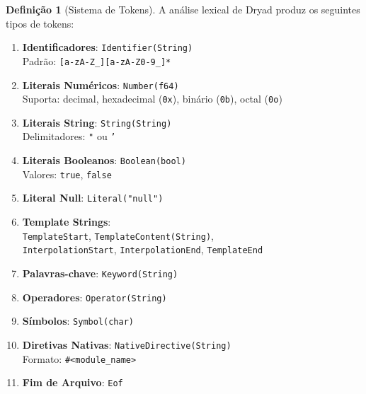 \documentclass[12pt,a4paper]{article}
\theoremstyle{definition}
\newtheorem{definition}{Definição}[section]
\begin{document}
\begin{definition}[Sistema de Tokens]
A análise lexical de Dryad produz os seguintes tipos de tokens:

\begin{enumerate}
    \item \textbf{Identificadores}: \texttt{Identifier(String)} \\
    Padrão: \texttt{[a-zA-Z\_][a-zA-Z0-9\_]*}
    
    \item \textbf{Literais Numéricos}: \texttt{Number(f64)} \\
    Suporta: decimal, hexadecimal (\texttt{0x}), binário (\texttt{0b}), octal (\texttt{0o})
    
    \item \textbf{Literais String}: \texttt{String(String)} \\
    Delimitadores: \texttt{"} ou \texttt{'}
    
    \item \textbf{Literais Booleanos}: \texttt{Boolean(bool)} \\
    Valores: \texttt{true}, \texttt{false}
    
    \item \textbf{Literal Null}: \texttt{Literal("null")}
    
    \item \textbf{Template Strings}: \\
    \texttt{TemplateStart}, \texttt{TemplateContent(String)}, \\
    \texttt{InterpolationStart}, \texttt{InterpolationEnd}, \texttt{TemplateEnd}
    
    \item \textbf{Palavras-chave}: \texttt{Keyword(String)}
    
    \item \textbf{Operadores}: \texttt{Operator(String)}
    
    \item \textbf{Símbolos}: \texttt{Symbol(char)}
    
    \item \textbf{Diretivas Nativas}: \texttt{NativeDirective(String)} \\
    Formato: \texttt{\#<module\_name>}
    
    \item \textbf{Fim de Arquivo}: \texttt{Eof}
\end{enumerate}
\end{definition}
\end{document}
